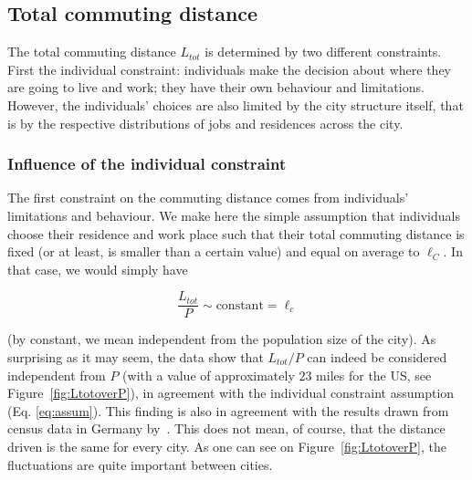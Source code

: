 \subsection{Total commuting distance}
\label{sec:total_length_driven}

The total commuting distance $L_{tot}$ is determined by two different
constraints. First the individual constraint: individuals make the decision
about where they are going to live and work; they have their own behaviour and
limitations. However, the individuals' choices are also limited by the city
structure itself, that is by the respective distributions of jobs and residences across the
city.



\subsubsection{Influence of the individual constraint} 

The first constraint on the commuting distance comes from individuals' limitations and
behaviour. We make here the simple assumption that individuals choose their
residence and work place such that their total commuting distance is fixed (or
at least, is smaller than a certain value) and equal on average to $\ell_C$. In that
case, we would simply have

\begin{equation} 
    \frac{L_{tot}}{P} \sim \text{constant} = \ell_c 
    \label{eq:assum}
\end{equation}

(by constant, we mean independent from the population size of the city). As
surprising as it may seem, the data show that $L_{tot}/P$ can indeed be considered
 independent from $P$ (with a value of approximately $23$ miles for
the US, see Figure~\ref{fig:LtotoverP}), in agreement with the individual
constraint assumption (Eq. \ref{eq:assum}). This finding is also in agreement
with the results drawn from census data in Germany by~\cite{Wilkerson:2014}.
This does not mean, of course, that the distance driven is the same for every
city. As one can see on Figure~\ref{fig:LtotoverP}, the fluctuations are quite
important between cities.  

